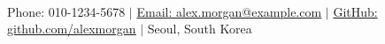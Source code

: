 \begin{center}
    \textbf{\LARGE \scshape \textcolor{accent}{}} \\ \vspace{2pt}
    \vspace{5pt}
    \small
    Phone: 010-1234-5678 $|$
    \href{mailto:alex.morgan@example.com}{Email: \underline{alex.morgan@example.com}} $|$
    \href{https://github.com/alexmorgan}{GitHub: \underline{github.com/alexmorgan}} $|$
    Seoul, South Korea
\end{center}
